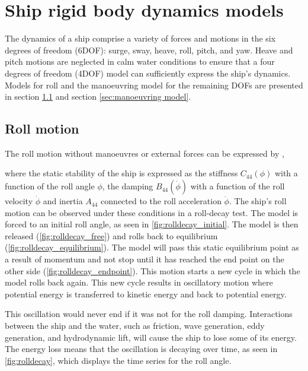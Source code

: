 \chapter{Ship rigid body dynamics models}
\label{ch:models}

The dynamics of a ship comprise a variety of forces and motions in the six degrees of freedom (6DOF): surge, sway, heave, roll, pitch, and yaw. Heave and pitch motions are neglected in calm water conditions to ensure that a four degrees of freedom (4DOF) model can sufficiently express the ship's dynamics. Models for roll and the manoeuvring model for the remaining DOFs are presented in section \ref{sec:roll} and section \ref{sec:manoeuvring model}. 

\section{Roll motion} \label{sec:roll}
The roll motion without manoeuvres or external forces can be expressed by  \cite{himeno_prediction_1981},

\noindent where the static stability of the ship is expressed as the stiffness $C_{44}(\phi)$ with a function of the roll angle $\phi$, the damping $B_{44}(\dot{\phi})$ with a function of the roll velocity $\dot{\phi}$ and inertia $A_{44}$ connected to the roll acceleration $\ddot{\phi}$. The ship's roll motion can be observed under these conditions in a roll-decay test. The model is forced to an initial roll angle, as seen in \autoref{fig:rolldecay_initial}. The model is then released (\autoref{fig:rolldecay_free}) and rolls back to equilibrium (\autoref{fig:rolldecay_equilibrium}). The model will pass this static equilibrium point as a result of momentum and not stop until it has reached the end point on the other side (\autoref{fig:rolldecay_endpoint}). This motion starts a new cycle in which the model rolls back again. This new cycle results in oscillatory motion where potential energy is transferred to kinetic energy and back to potential energy.

\noindent This oscillation would never end if it was not for the roll damping. Interactions between the ship and the water, such as friction, wave generation, eddy generation, and hydrodynamic lift, will cause the ship to lose some of its energy. The energy loss means that the oscillation is decaying over time, as seen in \autoref{fig:rolldecay}, which displays the time series for the roll angle.

